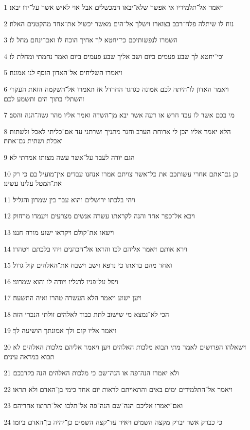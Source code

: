 \par 1 ויאמר אל־תלמידיו אי אפשר שלא־יבאו המכשלים אבל אוי לאיש אשר על־ידו יבאו׃
\par 2 נוח לו שיתלה פלח־רכב בצוארו וישלך אל־הים מאשר יכשיל את־אחד מהקטנים האלה׃
\par 3 השמרו לנפשותיכם כי־יחטא לך אחיך הוכח לו ואם־ינחם מחל לו׃
\par 4 וכי־יחטא לך שבע פעמים ביום ושב אליך שבע פעמים ביום ואמר נחמתי ומחלת לו׃
\par 5 ויאמרו השליחים אל־האדון הוסף לנו אמונה׃
\par 6 ויאמר האדון לו־היתה לכם אמונה כגרגר החרדל אז תאמרו אל־השקמה הזאת העקרי והשתלי בתוך הים ותשמע לכם׃
\par 7 מי בכם אשר לו עבד חרש או רעה אשר יבא מן־השדה ואמר אליו מהר גשה־הנה והסב׃
\par 8 הלא יאמר אליו הכן לי ארוחת הערב וחגר מתניך ושרתני עד אם־כליתי לאכל ולשתות ואכלת ושתית גם־אתה׃
\par 9 הגם יודה לעבד על־אשר עשה מצותו אמרתי לא׃
\par 10 כן גם־אתם אחרי עשותכם את כל־אשר צויתם אמרו אנחנו עבדים אין־מועיל בם כי רק את־המטל עלינו עשינו׃
\par 11 ויהי בלכתו ירושלים והוא עבר בין שמרון והגליל׃
\par 12 ויבא אל־כפר אחד והנה לקראתו עשרה אנשים מצרעים ויעמדו מרחוק׃
\par 13 וישאו את־קולם ויקראו ישוע מורה חננו׃
\par 14 וירא אותם ויאמר אליהם לכו והראו אל־הכהנים ויהי בלכתם ויטהרו׃
\par 15 ואחד מהם בראתו כי נרפא וישב וישבח את־האלהים קול גדול׃
\par 16 ויפל על־פניו לרגליו ויודה לו והוא שמרוני׃
\par 17 ויען ישוע ויאמר הלא העשרה טהרו ואיה התשעה׃
\par 18 הכי לא־נמצא מי שישוב לתת כבוד לאלהים זולתי הנכרי הזה׃
\par 19 ויאמר אליו קום ולך אמונתך הושיעה לך׃
\par 20 וישאלהו הפרושים לאמר מתי תבוא מלכות האלהים ויען ויאמר אליהם מלכות האלהים לא תבוא במראה עינים׃
\par 21 ולא יאמרו הנה־פה או הנה־שם כי מלכות האלהים הנה בקרבכם׃
\par 22 ויאמר אל־התלמידים ימים באים והתאויתם לראות יום אחד כימי בן־האדם ולא תראו׃
\par 23 ואם־יאמרו אליכם הנה־שם הנה־פה אל־תלכו ואל־תרוצו אחריהם׃
\par 24 כי כברק אשר יברק מקצה השמים ויאיר עד־קצה השמים כן־יהיה בן־האדם ביומו׃
